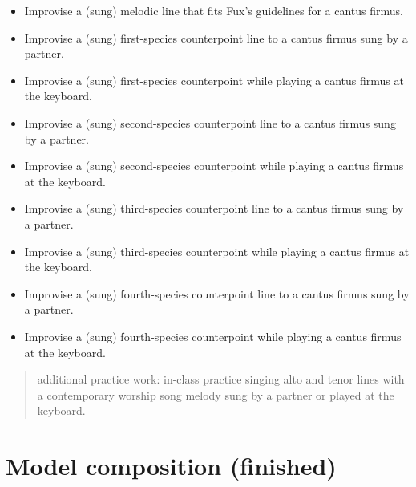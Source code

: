 \begin{itemize}
\item Improvise a (sung) melodic line that fits Fux's guidelines for a cantus firmus.

\item Improvise a (sung) first-species counterpoint line to a cantus firmus sung by a partner.

\item Improvise a (sung) first-species counterpoint while playing a cantus firmus at the keyboard.

\item Improvise a (sung) second-species counterpoint line to a cantus firmus sung by a partner.

\item Improvise a (sung) second-species counterpoint while playing a cantus firmus at the keyboard.

\item Improvise a (sung) third-species counterpoint line to a cantus firmus sung by a partner.

\item Improvise a (sung) third-species counterpoint while playing a cantus firmus at the keyboard.

\item Improvise a (sung) fourth-species counterpoint line to a cantus firmus sung by a partner.

\item Improvise a (sung) fourth-species counterpoint while playing a cantus firmus at the keyboard.

\end{itemize}

\begin{quote}

additional practice work: in-class practice singing alto and tenor lines with a contemporary worship song melody sung by a partner or played at the keyboard.
\end{quote}

\section{Model composition (finished)}
\label{modelcompositionfinished}

